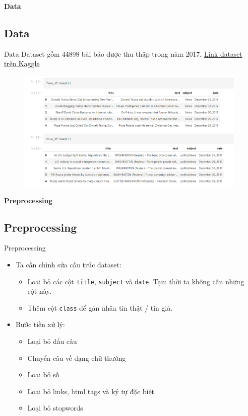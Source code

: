 \documentclass[aspectratio=169,xcolor=dvipsnames]{beamer}
\begin{document}
\begin{frame}
	\Huge{\centerline{\textbf{Data}}}
\end{frame}

\subsection{Data}
\begin{frame}{Data}
Dataset gồm 44898 bài báo được thu thập trong năm 2017. \href{https://www.kaggle.com/datasets/clmentbisaillon/fake-and-real-news-dataset}{Link dataset trên Kaggle}
\begin{figure}
\includegraphics[width=0.8\linewidth]{img/quick-glance-at-data.PNG}
\end{figure}
\end{frame}


\begin{frame}
	\Huge{\centerline{\textbf{Preprocessing}}}
\end{frame}

\subsection{Preprocessing}
\begin{frame}{Preprocessing}
\begin{itemize}
\item Ta cần chỉnh sửa cấu trúc dataset:
\begin{itemize}
\item Loại bỏ các cột \texttt{title}, \texttt{subject} và \texttt{date}. Tạm thời ta không cần những cột này.
\item Thêm cột \texttt{class} để gán nhãn tin thật / tin giả.
\end{itemize}
\item Bước tiền xử lý:
\begin{itemize}
\item Loại bỏ dấu câu
\item Chuyển câu về dạng chữ thường
\item Loại bỏ số
\item Loại bỏ links, html tags và ký tự đặc biệt
\item Loại bỏ stopwords
\end{itemize}
\end{itemize}
\end{frame}
\end{document}
